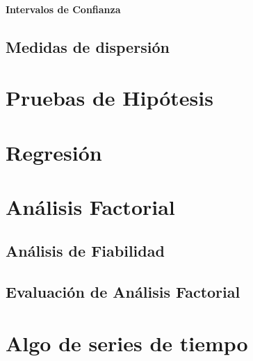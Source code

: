 \documentclass[]{book}
\begin{document}
\subsubsection{Intervalos de Confianza}\label{intervalos-de-confianza}

\section{Medidas de dispersión}\label{medidas-de-dispersion}

\chapter{Pruebas de Hipótesis}\label{pruebas-de-hipotesis}

\chapter{Regresión}\label{methods}

\chapter{Análisis Factorial}\label{analisis-factorial}

\section{Análisis de Fiabilidad}\label{analisis-de-fiabilidad}

\section{Evaluación de Análisis
Factorial}\label{evaluacion-de-analisis-factorial}

\chapter{Algo de series de tiempo}\label{algo-de-series-de-tiempo}


\end{document}
